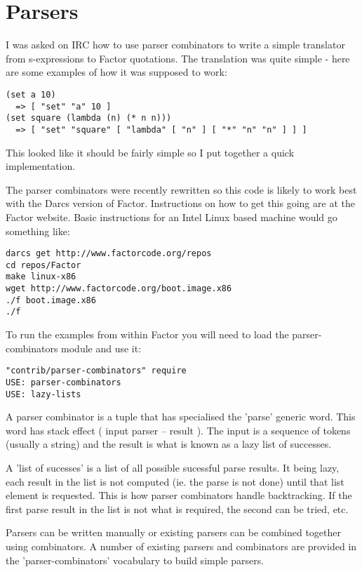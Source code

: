 \chapter{Parsers}\label{parsers}

I was asked on IRC how to use parser combinators to write a simple
translator from s-expressions to Factor quotations. The translation
was quite simple - here are some examples of how it was supposed to
work:

\begin{verbatim}
(set a 10) 
  => [ "set" "a" 10 ]
(set square (lambda (n) (* n n))) 
  => [ "set" "square" [ "lambda" [ "n" ] [ "*" "n" "n" ] ] ]
\end{verbatim}

This looked like it should be fairly simple so I put together a quick
implementation.

The parser combinators were recently rewritten so this code is likely
to work best with the Darcs version of Factor. Instructions on how to
get this going are at the Factor website. Basic instructions for an
Intel Linux based machine would go something like:

\begin{verbatim}
darcs get http://www.factorcode.org/repos
cd repos/Factor
make linux-x86
wget http://www.factorcode.org/boot.image.x86
./f boot.image.x86
./f
\end{verbatim}

To run the examples from within Factor you will need to load the
parser-combinators module and use it:

\begin{verbatim}
"contrib/parser-combinators" require
USE: parser-combinators
USE: lazy-lists
\end{verbatim}

A parser combinator is a tuple that has specialised the 'parse'
 generic word. This word has stack effect ( input parser -- result
 ). The input is a sequence of tokens (usually a string) and the
 result is what is known as a lazy list of successes.

A 'list of sucesses' is a list of all possible sucessful parse
 results. It being lazy, each result in the list is not computed
 (ie. the parse is not done) until that list element is
 requested. This is how parser combinators handle backtracking. If the
 first parse result in the list is not what is required, the second
 can be tried, etc.

Parsers can be written manually or existing parsers can be combined
 together using combinators. A number of existing parsers and
 combinators are provided in the 'parser-combinators' vocabulary to
 build simple parsers.

